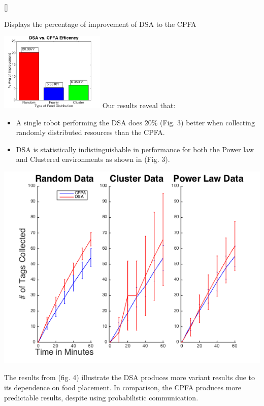 \documentclass[a0paper,portrait]{baposter}
\begin{document}
\begin{poster}
{[\FBwidth]
{\caption{Displays the percentage of improvement of DSA to the CPFA}\label{fig:test}}
{\includegraphics[width=5cm]{CPFAvsDSABar.png}}
Our results reveal that: 
\begin{itemize}
\item A single robot performing the DSA does $20\%$ (Fig. 3) better when collecting randomly distributed resources than the CPFA. 
\item DSA is statistically indistinguishable in performance for both the Power law and Clustered environments as shown in (Fig. 3).
\end{itemize}
\begin{center}
\includegraphics[scale=0.4]{CPFAvsDSALine.png}
\end{center}

The results from (fig. 4) illustrate the DSA produces more variant results due to its dependence on food placement. In comparison, the CPFA produces more predictable results, despite using probabilistic communication.


}


\end{poster}
\end{document}
